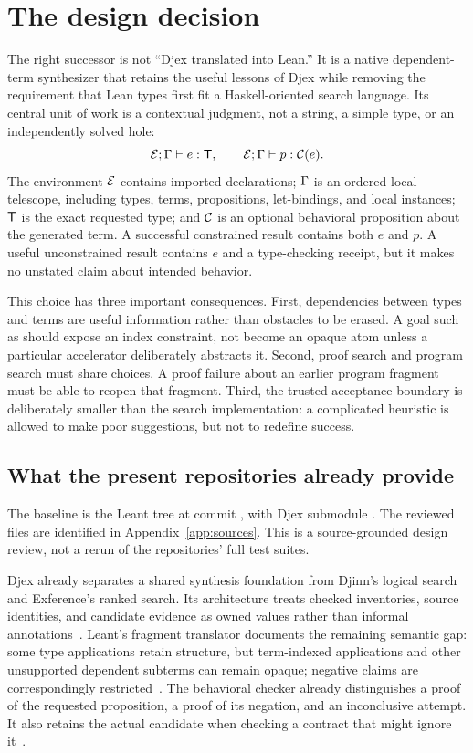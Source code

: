 \section{The design decision}
\label{sec:decision}
The right successor is not ``Djex translated into Lean.'' It is a native dependent-term synthesizer that retains the useful lessons of Djex while removing the requirement that Lean types first fit a Haskell-oriented search language. Its central unit of work is a contextual judgment, not a string, a simple type, or an independently solved hole:
\[
  \mathcal{E};\Gamma\vdash e:\mathsf{T},
  \qquad
  \mathcal{E};\Gamma\vdash p:\mathcal{C}(e).
\]
The environment $\mathcal{E}$ contains imported declarations; $\Gamma$ is an ordered local telescope, including types, terms, propositions, let-bindings, and local instances; $\mathsf{T}$ is the exact requested type; and $\mathcal{C}$ is an optional behavioral proposition about the generated term. A successful constrained result contains both $e$ and $p$. A useful unconstrained result contains $e$ and a type-checking receipt, but it makes no unstated claim about intended behavior.

This choice has three important consequences. First, dependencies between types and terms are useful information rather than obstacles to be erased. A goal such as  should expose an index constraint, not become an opaque atom unless a particular accelerator deliberately abstracts it. Second, proof search and program search must share choices. A proof failure about an earlier program fragment must be able to reopen that fragment. Third, the trusted acceptance boundary is deliberately smaller than the search implementation: a complicated heuristic is allowed to make poor suggestions, but not to redefine success.

\subsection{What the present repositories already provide}
The baseline is the Leant tree at commit , with Djex submodule . The reviewed files are identified in Appendix~\ref{app:sources}. This is a source-grounded design review, not a rerun of the repositories' full test suites.

Djex already separates a shared synthesis foundation from Djinn's logical search and Exference's ranked search. Its architecture treats checked inventories, source identities, and candidate evidence as owned values rather than informal annotations~\cite{djexarch}. Leant's fragment translator documents the remaining semantic gap: some type applications retain structure, but term-indexed applications and other unsupported dependent subterms can remain opaque; negative claims are correspondingly restricted~\cite{fragment}. The behavioral checker already distinguishes a proof of the requested proposition, a proof of its negation, and an inconclusive attempt. It also retains the actual candidate when checking a contract that might ignore it~\cite{behavioral}.

